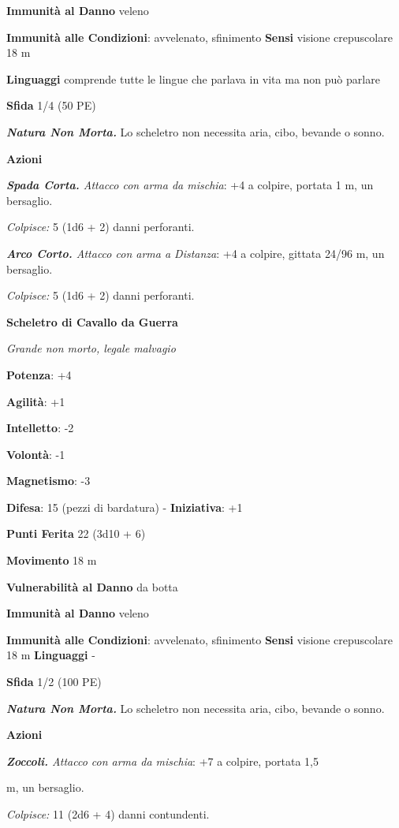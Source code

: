 \begin{multicols}{2}
\textbf{Immunità al Danno} veleno

\textbf{Immunità alle Condizioni}: avvelenato, sfinimento \textbf{Sensi}
visione crepuscolare 18 m

\textbf{Linguaggi} comprende tutte le lingue che parlava in vita ma non
può parlare

\textbf{Sfida} 1/4 (50 PE)\smallskip

\emph{\textbf{Natura Non Morta.}} Lo scheletro non necessita aria, cibo,
bevande o sonno.

\smallskip\textbf{Azioni}

\emph{\textbf{Spada Corta.} Attacco con arma da mischia}: +4 a colpire,
portata 1 m, un bersaglio.

\emph{Colpisce:} 5 (1d6 + 2) danni perforanti.

\emph{\textbf{Arco Corto.} Attacco con arma a Distanza}: +4 a colpire,
gittata 24/96 m, un bersaglio.

\emph{Colpisce:} 5 (1d6 + 2) danni perforanti.

\textbf{Scheletro di Cavallo da Guerra}

\emph{Grande non morto, legale malvagio}

\textbf{Potenza}: +4

\textbf{Agilità}: +1

\textbf{Intelletto}: -2

\textbf{Volontà}: -1

\textbf{Magnetismo}: -3

\textbf{Difesa}: 15 (pezzi di bardatura) - \textbf{Iniziativa}: +1

\textbf{Punti Ferita} 22 (3d10 + 6)

\textbf{Movimento} 18 m

\textbf{Vulnerabilità al Danno} da botta

\textbf{Immunità al Danno} veleno

\textbf{Immunità alle Condizioni}: avvelenato, sfinimento \textbf{Sensi}
visione crepuscolare 18 m \textbf{Linguaggi} -

\textbf{Sfida} 1/2 (100 PE)\smallskip

\emph{\textbf{Natura Non Morta.}} Lo scheletro non necessita aria, cibo,
bevande o sonno.

\smallskip\textbf{Azioni}


\emph{\textbf{Zoccoli.} Attacco con arma da mischia}: +7 a colpire,
portata 1,5

m, un bersaglio.

\emph{Colpisce:} 11 (2d6 + 4) danni contundenti.



\end{multicols}
